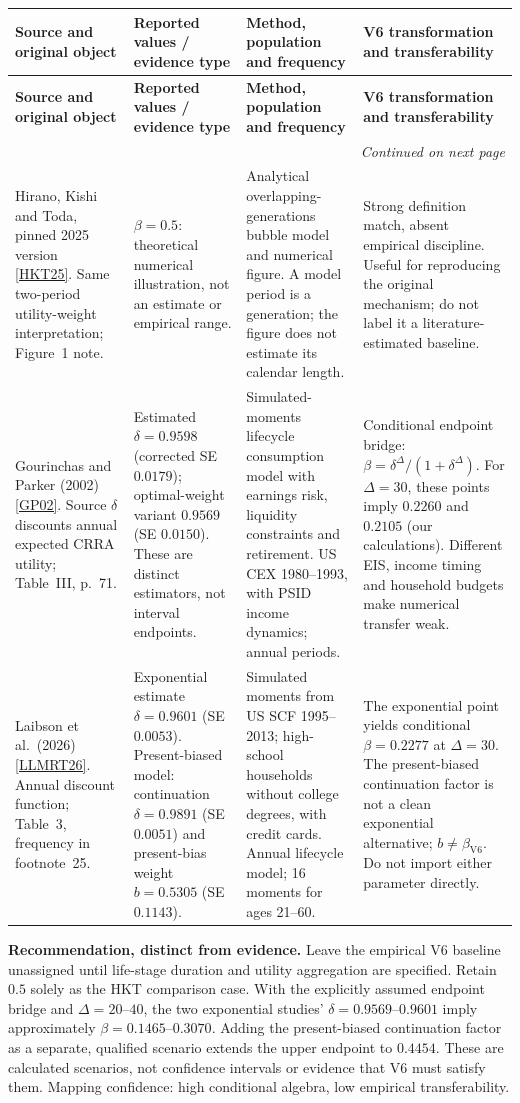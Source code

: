 \documentclass[10pt,a4paper,landscape]{article}
\makeatletter
\newcommand{\src}[1]{\hyperlink{ref:#1}{\textsf{[#1]}}}
\newenvironment{evidence}{%
\fontsize{9.4}{10.9}\selectfont\setlength{\parskip}{2pt}
\begin{longtable}{@{}P{\dimexpr .22\textwidth-7.5pt\relax}P{\dimexpr .24\textwidth-7.5pt\relax}P{\dimexpr .25\textwidth-7.5pt\relax}P{\dimexpr .29\textwidth-7.5pt\relax}@{}}
\toprule\rowcolor{tablehead}\textbf{Source and original object} & \textbf{Reported values / evidence type} & \textbf{Method, population and frequency} & \textbf{V6 transformation and transferability}\\\midrule
\endfirsthead
\toprule\rowcolor{tablehead}\textbf{Source and original object} & \textbf{Reported values / evidence type} & \textbf{Method, population and frequency} & \textbf{V6 transformation and transferability}\\\midrule
\endhead
\midrule\multicolumn{4}{r}{\footnotesize\itshape Continued on next page}\\\endfoot
\bottomrule\endlastfoot
}{\end{longtable}}
\makeatother
\begin{document}
\begin{evidence}
Hirano, Kishi and Toda, pinned 2025 version \src{HKT25}.
Same two-period utility-weight interpretation; Figure~1 note.
&
$\beta=0.5$: theoretical numerical illustration, not an estimate or empirical
range.
&
Analytical overlapping-generations bubble model and numerical figure.
A model period is a generation; the figure does not estimate its calendar length.
&
Strong definition match, absent empirical discipline. Useful for reproducing
the original mechanism; do not label it a literature-estimated baseline.
\\[5pt]
Gourinchas and Parker (2002) \src{GP02}.
Source $\delta$ discounts annual expected CRRA utility; Table~III, p.~71.
&
Estimated $\delta=0.9598$ (corrected SE $0.0179$); optimal-weight variant
$0.9569$ (SE $0.0150$). These are distinct estimators, not interval endpoints.
&
Simulated-moments lifecycle consumption model with earnings risk, liquidity
constraints and retirement. US CEX 1980--1993, with PSID income dynamics;
annual periods.
&
Conditional endpoint bridge:
$\beta=\delta^\Delta/(1+\delta^\Delta)$.
For $\Delta=30$, these points imply $0.2260$ and $0.2105$ (our calculations).
Different EIS, income timing and household budgets make numerical transfer weak.
\\[5pt]
Laibson et al.\ (2026) \src{LLMRT26}.
Annual discount function; Table~3, frequency in footnote~25.
&
Exponential estimate $\delta=0.9601$ (SE $0.0053$).
Present-biased model: continuation $\delta=0.9891$ (SE $0.0051$) and
present-bias weight $b=0.5305$ (SE $0.1143$).
&
Simulated moments from US SCF 1995--2013; high-school households without
college degrees, with credit cards. Annual lifecycle model; 16 moments for
ages 21--60.
&
The exponential point yields conditional $\beta=0.2277$ at $\Delta=30$.
The present-biased continuation factor is not a clean exponential alternative;
$b\neq\beta_{\mathrm{V6}}$. Do not import either parameter directly.
\\[5pt]
\end{evidence}

\noindent\textbf{Recommendation, distinct from evidence.}
Leave the empirical V6 baseline unassigned until life-stage duration and utility
aggregation are specified. Retain $0.5$ solely as the HKT comparison case.
With the explicitly assumed endpoint bridge and $\Delta=20$--$40$, the two
exponential studies' $\delta=0.9569$--$0.9601$ imply approximately
$\beta=0.1465$--$0.3070$. Adding the present-biased continuation factor as a
separate, qualified scenario extends the upper endpoint to $0.4454$.
These are calculated scenarios, not confidence intervals or evidence that V6
must satisfy them. Mapping confidence: high conditional algebra, low empirical
transferability.
\end{document}
